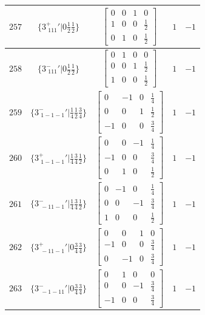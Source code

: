 \documentclass[fleqn,8pt]{jsarticle}
\begin{document}
\begin{longtable}{ccccc}
$ 257 $ & $ \{3^{+}_{\,\,111}{}'|0 \frac{1}{2} \frac{1}{2}\} $ & $ \begin{bmatrix} 0 & 0 & 1 & 0 \\ 1 & 0 & 0 & \frac{1}{2} \\ 0 & 1 & 0 & \frac{1}{2} \end{bmatrix} $ & $ 1 $ & $ -1 $ \\ \hline
$ 258 $ & $ \{3^{-}_{\,\,111}{}'|0 \frac{1}{2} \frac{1}{2}\} $ & $ \begin{bmatrix} 0 & 1 & 0 & 0 \\ 0 & 0 & 1 & \frac{1}{2} \\ 1 & 0 & 0 & \frac{1}{2} \end{bmatrix} $ & $ 1 $ & $ -1 $ \\ \hline
$ 259 $ & $ \{3^{-}_{\,\,1-1-1}{}'|\frac{1}{4} \frac{1}{2} \frac{3}{4}\} $ & $ \begin{bmatrix} 0 & -1 & 0 & \frac{1}{4} \\ 0 & 0 & 1 & \frac{1}{2} \\ -1 & 0 & 0 & \frac{3}{4} \end{bmatrix} $ & $ 1 $ & $ -1 $ \\ \hline
$ 260 $ & $ \{3^{+}_{\,\,1-1-1}{}'|\frac{1}{4} \frac{3}{4} \frac{1}{2}\} $ & $ \begin{bmatrix} 0 & 0 & -1 & \frac{1}{4} \\ -1 & 0 & 0 & \frac{3}{4} \\ 0 & 1 & 0 & \frac{1}{2} \end{bmatrix} $ & $ 1 $ & $ -1 $ \\ \hline
$ 261 $ & $ \{3^{-}_{\,\,-11-1}{}'|\frac{1}{4} \frac{3}{4} \frac{1}{2}\} $ & $ \begin{bmatrix} 0 & -1 & 0 & \frac{1}{4} \\ 0 & 0 & -1 & \frac{3}{4} \\ 1 & 0 & 0 & \frac{1}{2} \end{bmatrix} $ & $ 1 $ & $ -1 $ \\ \hline
$ 262 $ & $ \{3^{+}_{\,\,-11-1}{}'|0 \frac{3}{4} \frac{3}{4}\} $ & $ \begin{bmatrix} 0 & 0 & 1 & 0 \\ -1 & 0 & 0 & \frac{3}{4} \\ 0 & -1 & 0 & \frac{3}{4} \end{bmatrix} $ & $ 1 $ & $ -1 $ \\ \hline
$ 263 $ & $ \{3^{-}_{\,\,-1-11}{}'|0 \frac{3}{4} \frac{3}{4}\} $ & $ \begin{bmatrix} 0 & 1 & 0 & 0 \\ 0 & 0 & -1 & \frac{3}{4} \\ -1 & 0 & 0 & \frac{3}{4} \end{bmatrix} $ & $ 1 $ & $ -1 $ \\ \hline

\end{longtable}
\end{document}
